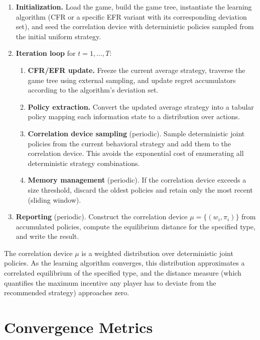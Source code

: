 \documentclass[11pt]{article}
\begin{document}
\begin{enumerate}
    \item \textbf{Initialization.} Load the game, build the game tree, instantiate the learning algorithm (CFR or a specific EFR variant with its corresponding deviation set), and seed the correlation device with deterministic policies sampled from the initial uniform strategy.

    \item \textbf{Iteration loop} for $t = 1, \ldots, T$:
    \begin{enumerate}
        \item \textbf{CFR/EFR update.} Freeze the current average strategy, traverse the game tree using external sampling, and update regret accumulators according to the algorithm's deviation set.
        \item \textbf{Policy extraction.} Convert the updated average strategy into a tabular policy mapping each information state to a distribution over actions.
        \item \textbf{Correlation device sampling} (periodic). Sample deterministic joint policies from the current behavioral strategy and add them to the correlation device. This avoids the exponential cost of enumerating all deterministic strategy combinations.
        \item \textbf{Memory management} (periodic). If the correlation device exceeds a size threshold, discard the oldest policies and retain only the most recent (sliding window).
    \end{enumerate}

    \item \textbf{Reporting} (periodic). Construct the correlation device $\mu = \{(w_i, \pi_i)\}$ from accumulated policies, compute the equilibrium distance for the specified type, and write the result.
\end{enumerate}

The correlation device $\mu$ is a weighted distribution over deterministic joint policies. As the learning algorithm converges, this distribution approximates a correlated equilibrium of the specified type, and the distance measure (which quantifies the maximum incentive any player has to deviate from the recommended strategy) approaches zero.

\section{Convergence Metrics}
\label{sec:metrics}
\end{document}
